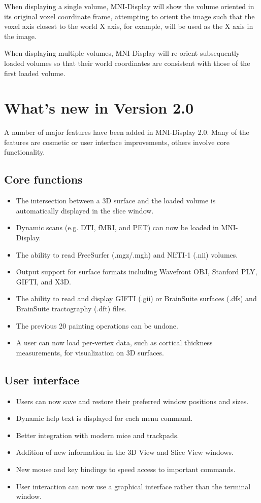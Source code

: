 \documentclass[11pt,letterpaper]{article}
\newcommand{\display}{\mbox{MNI-Display}}
\begin{document}
When displaying a single volume, \display{} will show the volume
oriented in its original voxel coordinate frame, attempting to orient
the image such that the voxel axis closest to the world X axis, for
example, will be used as the X axis in the image.

When displaying multiple volumes, \display{} will re-orient subsequently
loaded volumes so that their world coordinates are consistent with
those of the first loaded volume.

\section{What's new in Version 2.0}

A number of major features have been added in \display{} 2.0. Many of
the features are cosmetic or user interface improvements, others
involve core functionality.

\subsection{Core functions}
\begin{itemize}
\item The intersection between a 3D surface and the loaded volume is automatically displayed in the slice window.
\item Dynamic scans (e.g. DTI, fMRI, and PET) can now be loaded in \display{}.
\item The ability to read FreeSurfer (.mgz/.mgh) and NIfTI-1 (.nii)
  volumes.
\item Output support for surface formats including Wavefront OBJ,
  Stanford PLY, GIFTI, and X3D.
\item The ability to read and display GIFTI (.gii) or BrainSuite surfaces (.dfs) and BrainSuite tractography (.dft) files.
\item The previous 20 painting operations can be undone.
\item A user can now load per-vertex data, such as cortical thickness measurements, for visualization on 3D surfaces.
\end{itemize}

\subsection{User interface}
\begin{itemize}
\item Users can now save and restore their preferred window positions and sizes.
\item Dynamic help text is displayed for each menu command.
\item Better integration with modern mice and trackpads.
\item Addition of new information in the 3D View and Slice View windows.
\item New mouse and key bindings to speed access to important commands.
\item User interaction can now use a graphical interface rather than the
terminal window.
\end{itemize}
\end{document}
